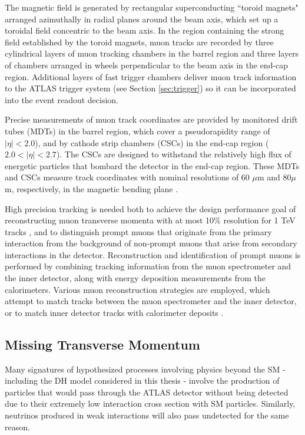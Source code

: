 The magnetic field is generated by rectangular superconducting ``toroid magnets" arranged azimuthally in radial planes around the beam axis, which set up a toroidal field concentric to the beam axis. In the region containing the strong field established by the toroid magnets, muon tracks are recorded by three cylindrical layers of muon tracking chambers in the barrel region and three layers of chambers arranged in wheels perpendicular to the beam axis in the end-cap region. Additional layers of fast trigger chambers deliver muon track information to the ATLAS trigger system (see Section \ref{sec:trigger}) so it can be incorporated into the event readout decision. 

Precise measurements of muon track coordinates are provided by monitored drift tubes (MDTs) in the barrel region, which cover a pseudorapidity range of \(|\eta|<2.0\)), and by cathode strip chambers (CSCs) in the end-cap region (\(2.0<|\eta|<2.7\)). The CSCs are designed to withstand the relatively high flux of energetic particles that bombard the detector in the end-cap region. These MDTs and CSCs measure track coordinates with nominal resolutions of 60 \(\mu\)m and 80\(\mu\)m, respectively, in the magnetic bending plane \cite{muon_reco}. 

High precision tracking is needed both to achieve the design performance goal of reconstructing muon transverse momenta with at most 10\% resolution for 1 TeV tracks \cite{atlas}, and to distinguish prompt muons that originate from the primary interaction from the background of non-prompt muons that arise from secondary interactions in the detector. Reconstruction and identification of prompt muons is performed by combining tracking information from the muon spectrometer and the inner detector, along with energy deposition measurements from the calorimeters. Various muon reconstruction strategies are employed, which attempt to match tracks between the muon spectrometer and the inner detector, or to match inner detector tracks with calorimeter deposits \cite{muon_reco}.

\subsection{Missing Transverse Momentum}
\label{sec:met}

Many signatures of hypothesized processes involving physics beyond the SM - including the DH model considered in this thesis - involve the production of particles that would pass through the ATLAS detector without being detected due to their extremely low interaction cross section with SM particles. Similarly, neutrinos produced in weak interactions will also pass undetected for the same reason. 

